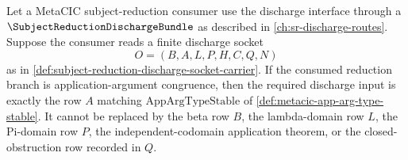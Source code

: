 \begin{proposition}
\label{prop:metacic-appargtypestable-discharge-row-required}
Let a MetaCIC subject-reduction consumer use the discharge interface through a $\SubjectReductionDischargeBundle$ as described in \autoref{ch:sr-discharge-routes}. Suppose the consumer reads a finite discharge socket
$$
O=(B,A,L,P,H,C,Q,N)
$$
as in \autoref{def:subject-reduction-discharge-socket-carrier}. If the consumed reduction branch is application-argument congruence, then the required discharge input is exactly the row $A$ matching $\mathrm{AppArgTypeStable}$ of \autoref{def:metacic-app-arg-type-stable}. It cannot be replaced by the beta row $B$, the lambda-domain row $L$, the Pi-domain row $P$, the independent-codomain application theorem, or the closed-obstruction row recorded in $Q$.
\end{proposition}
